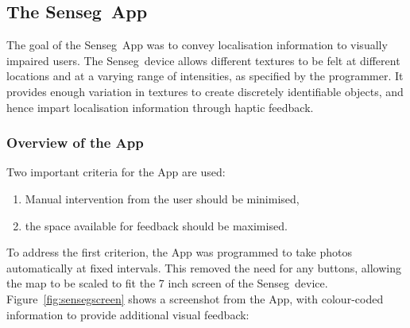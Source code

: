 \subsection{The Senseg\texttrademark\ App}
The goal of the Senseg\texttrademark\ App was to convey localisation information to visually impaired users. The Senseg\texttrademark\ device allows different textures to be felt at different locations and at a varying range of intensities, as specified by the programmer. It provides enough variation in textures to create discretely identifiable objects, and hence impart localisation information through haptic feedback.

\subsubsection{Overview of the App} 
Two important criteria for the App are used: 

\begin{enumerate}
\item Manual intervention from the user should be minimised,
\item the space available for feedback should be maximised. 
\end{enumerate}

To address the first criterion, the App was programmed to take photos automatically at fixed intervals. This removed the need for any buttons, allowing the map to be scaled to fit the 7 inch screen of the Senseg\texttrademark\ device. Figure~\ref{fig:sensegscreen} shows a screenshot from the App, with colour-coded information to provide additional visual feedback:

